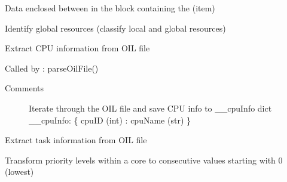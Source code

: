\documentclass[letterpaper,10pt,english]{sphinxmanual}
\begin{document}
\begin{fulllineitems}
\begin{fulllineitems}
\begin{description}
Data enclosed between in the block containing the (item)

\end{description}

\end{fulllineitems}


\begin{fulllineitems}
\label{\detokenize{code:FlexTool.FlexTool._FlexTool__findGlobalResources}}
Identify global resources (classify local and global resources)

\end{fulllineitems}


\begin{fulllineitems}
\label{\detokenize{code:FlexTool.FlexTool._FlexTool__parseCpuInfo}}
Extract CPU information from OIL file

Called by   :   parseOilFile()
\begin{description}
\item[{Comments}] \leavevmode{[}{]}
Iterate through the OIL file and save CPU info to \_\_cpuInfo dict
\_\_cpuInfo:
\{ cpuID (int) : cpuName (str) \}

\end{description}

\end{fulllineitems}


\begin{fulllineitems}
\label{\detokenize{code:FlexTool.FlexTool._FlexTool__parseTaskInfo}}
Extract task information from OIL file

\end{fulllineitems}


\begin{fulllineitems}
\label{\detokenize{code:FlexTool.FlexTool._FlexTool__reducePriorities}}
Transform priority levels within a core to consecutive values starting with 0 (lowest)


\end{fulllineitems}
\end{fulllineitems}
\end{document}
